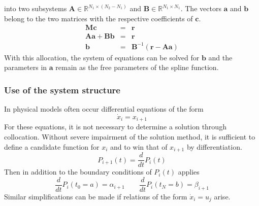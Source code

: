 \documentclass[letterpaper,10pt,english]{sphinxmanual}
\begin{document}
into two subsystems \(\boldsymbol{A}\in \mathbb{R}^{N_1 \times (N_2 - N_1)}\) and \(\boldsymbol{B}\in \mathbb{R}^{N_1 \times N_1}\).
The vectors \(\boldsymbol{a}\) and \(\boldsymbol{b}\) belong to the two matrices with the respective coefficients of \(\boldsymbol{c}\).
\begin{eqnarray*}
   \boldsymbol{M} \boldsymbol{c} & = & \boldsymbol{r} \\
   \boldsymbol{A} \boldsymbol{a} + \boldsymbol{B} \boldsymbol{b} & = & \boldsymbol{r} \\
   \boldsymbol{b} & = & \boldsymbol{B}^{-1} (\boldsymbol{r} - \boldsymbol{A} \boldsymbol{a})
\end{eqnarray*}
With this allocation, the system of equations can be solved for \(\boldsymbol{b}\) and the parameters in \(\boldsymbol{a}\)
remain as the free parameters of the spline function.


\subsubsection{Use of the system structure}
\label{guide/background:system-structure}\label{guide/background:use-of-the-system-structure}
In physical models often occur differential equations of the form
\begin{equation*}
    \dot{x}_i = x_{i+1}
\end{equation*}
For these equations, it is not necessary to determine a solution through collocation. Without severe impairment of the solution method,
it is sufficient to define a candidate function for \(x_i\) and to win that of \(x_{i+1}\) by differentiation.
\begin{equation*}
   P_{i+1}(t) = \frac{d}{d t}P_i(t)
\end{equation*}
Then in addition to the boundary conditions of \(P_i(t)\) applies
\begin{equation*}
   \frac{d}{d t}P_i(t_0=a) = \alpha_{i+1} \qquad \frac{d}{d t}P_i(t_N=b) = \beta_{i+1}
\end{equation*}
Similar simplifications can be made if relations of the form \(\dot{x}_i = u_j\) arise.
\end{document}
